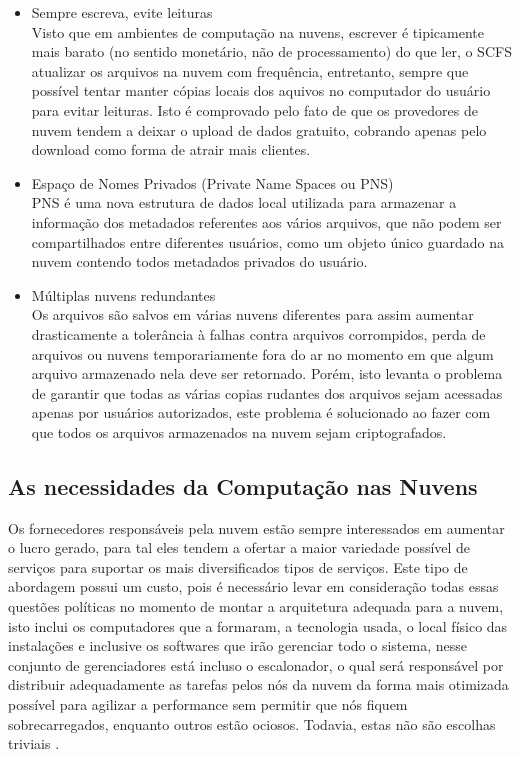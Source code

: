 \begin{itemize}
	\item Sempre escreva, evite leituras\\
	Visto que em ambientes de computação na nuvens, escrever é tipicamente mais barato (no sentido monetário, não de processamento) do que ler, o SCFS atualizar os arquivos na nuvem com frequência, entretanto, sempre que possível tentar manter cópias locais dos aquivos no computador do usuário para evitar leituras. Isto é comprovado pelo fato de que os provedores de nuvem tendem a deixar o upload de dados gratuito, cobrando apenas pelo download como forma de atrair mais clientes.
	\item Espaço de Nomes Privados (Private Name Spaces ou PNS)\\
	PNS é uma nova estrutura de dados local utilizada para armazenar a informação dos metadados referentes aos vários arquivos, que não podem ser compartilhados entre diferentes usuários, como um objeto único guardado na nuvem contendo todos metadados privados do usuário.
	\item Múltiplas nuvens redundantes\\
	Os arquivos são salvos em várias nuvens diferentes para assim aumentar drasticamente a tolerância à falhas contra arquivos corrompidos, perda de arquivos ou nuvens temporariamente fora do ar no momento em que algum arquivo armazenado nela deve ser retornado. Porém, isto levanta o problema de garantir que todas as várias copias rudantes dos arquivos sejam acessadas apenas por usuários autorizados, este problema é solucionado ao fazer com que todos os arquivos armazenados na nuvem sejam criptografados.
\end{itemize}


\subsection{As necessidades da Computação nas Nuvens}
Os fornecedores responsáveis pela nuvem estão sempre interessados em aumentar o lucro gerado, para tal eles tendem a ofertar a maior variedade possível de serviços para suportar os mais diversificados tipos de serviços. Este tipo de abordagem possui um custo, pois é necessário levar em consideração todas essas questões políticas no momento de montar a arquitetura adequada para a nuvem, isto inclui os computadores que a formaram, a tecnologia usada, o local físico das instalações e inclusive os softwares que irão gerenciar todo o sistema, nesse conjunto de gerenciadores está incluso o escalonador, o qual será responsável por distribuir adequadamente as tarefas pelos nós da nuvem da forma mais otimizada possível para agilizar a performance sem permitir que nós fiquem sobrecarregados, enquanto outros estão ociosos. Todavia, estas não são escolhas triviais \cite{drasko1}.\\


